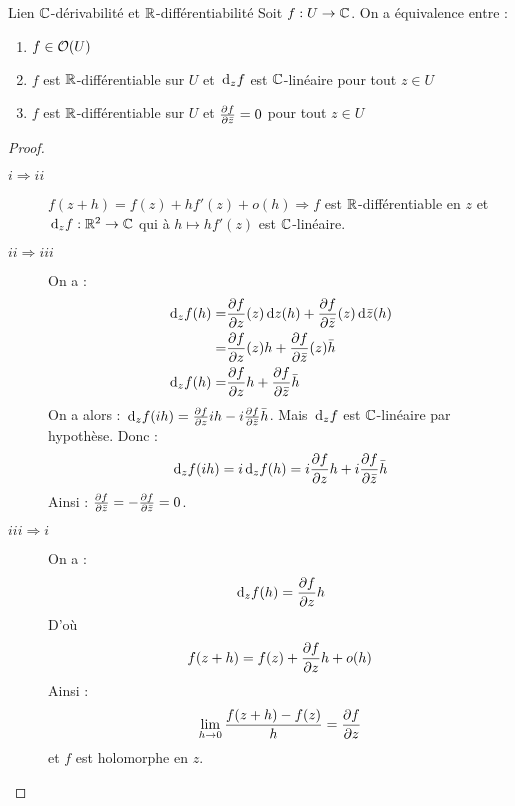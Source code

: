 \documentclass{cours}
\begin{document}
\begin{théorème}{Lien $\mathbb{C}$-dérivabilité et $\mathbb{R}$-différentiabilité}{}
	Soit $f : U \to \mathbb{C}$. On a équivalence entre : 
	\begin{enumerate}
		\item $f \in \mathcal{O}(U)$
		\item $f$ est $\mathbb{R}$-différentiable sur $U$ et ${\rm \, d}_{z} f$ est $\mathbb{C}$-linéaire pour tout $z \in U$
		\item $f$ est $\mathbb{R}$-différentiable sur $U$ et $\frac{\partial f}{\partial \bar{z}} = 0$ pour tout $z \in U$
	\end{enumerate}
\end{théorème}

\begin{proof}
	\begin{description}
		\item[$i \Rightarrow ii$] $f(z + h) = f(z) + hf'(z) + o(h) \Longrightarrow f$ est $\mathbb{R}$-différentiable en $z$ et ${\rm \, d}_{z}f : \mathbb{R}^{2}\to \mathbb{C}$ qui à $h \mapsto hf'(z)$ est $\mathbb{C}$-linéaire.
		\item[$ii \Rightarrow iii$] On a : 
			\[
				\begin{aligned}
					{\rm \, d}_{z}f(h) = & \frac{\partial f}{\partial z}(z){\rm \, d} z(h) + \frac{\partial f}{\partial \bar{z}}(z){\rm \, d} \bar{z}(h)\\
					= & \frac{\partial f}{\partial z}(z)h + \frac{\partial f}{\partial \bar{z}}(z)\bar{h}\\
					{\rm \, d}_{z}f(h) =& \frac{\partial f}{\partial z}h + \frac{\partial f}{\partial \bar{z}}\bar{h}
				\end{aligned}
			\]
			On a alors : ${\rm \, d}_{z}f(ih) = \frac{\partial f}{\partial z}ih -i\frac{\partial f}{\partial \bar{z}}\bar{h}$. Mais ${\rm \, d}_{z}f$ est $\mathbb{C}$-linéaire par hypothèse. Donc : 
			\[
				{\rm \, d}_{z}f(ih) = i{\rm \, d}_{z}f(h) = i\frac{\partial f}{\partial z}h + i\frac{\partial f}{\partial \bar{z}}\bar{h}
			\]
			Ainsi : $\frac{\partial f}{\partial \bar{z}} = - \frac{\partial f}{\partial \bar{z}} = 0$.
		\item[$iii \Rightarrow i$] On a : 
			\[
				{\rm \, d}_{z}f(h) = \frac{\partial f}{\partial z}h
			\]
			D'où 
			\[
				f(z + h) = f(z) + \frac{\partial f}{\partial z}h + o(h)
			\]
			Ainsi : 
			\[	
				\lim_{h \to 0}\frac{f(z + h) - f(z)}{h} = \frac{\partial f}{\partial z}
			\]
			et $f$ est holomorphe en $z$. 
	\end{description}
\end{proof}
\end{document}
